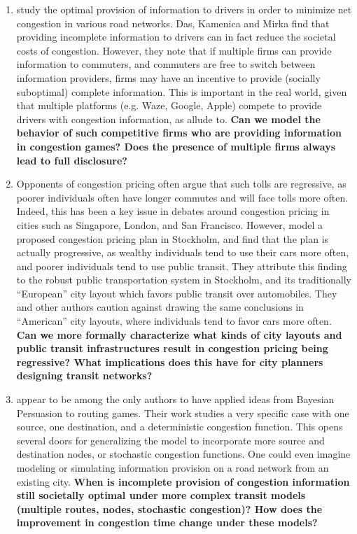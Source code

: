 \documentclass[JEL]{AEA}
\begin{document}
\begin{enumerate}
\item \cite{das-2017} study the optimal provision of information to drivers in order to minimize net congestion in various road networks. Das, Kamenica and Mirka find that providing incomplete information to drivers can in fact reduce the societal costs of congestion. However, they note that if multiple firms can provide information to commuters, and commuters are free to switch between information providers, firms may have an incentive to provide (socially suboptimal) complete information. This is important in the real world, given that multiple platforms (e.g. Waze, Google, Apple) compete to provide drivers with congestion information, as \cite{ostrovsky-2018} allude to. \textbf{Can we model the behavior of such competitive firms who are providing information in congestion games? Does the presence of multiple firms always lead to full disclosure?}

\item Opponents of congestion pricing often argue that such tolls are regressive, as poorer individuals often have longer commutes and will face tolls more often. Indeed, this has been a key issue in debates around congestion pricing in cities such as Singapore, London, and San Francisco. However, \cite{eliasson-2006} model a proposed congestion pricing plan in Stockholm, and find that the plan is actually progressive, as wealthy individuals tend to use their cars more often, and poorer individuals tend to use public transit. They attribute this finding to the robust public transportation system in Stockholm, and its traditionally ``European” city layout which favors public transit over automobiles. They and other authors caution against drawing the same conclusions in ``American” city layouts, where individuals tend to favor cars more often. \textbf{Can we more formally characterize what kinds of city layouts and public transit infrastructures result in congestion pricing being regressive? What implications does this have for city planners designing transit networks?}

\item \cite{das-2017} appear to be among the only authors to have applied ideas from Bayesian Persuasion to routing games. Their work studies a very specific case with one source, one destination, and a deterministic congestion function. This opens several doors for generalizing the model to incorporate more source and destination nodes, or stochastic congestion functions. One could even imagine modeling or simulating information provision on a road network from an existing city. \textbf{When is incomplete provision of congestion information still societally optimal under more complex transit models (multiple routes, nodes, stochastic congestion)? How does the improvement in congestion time change under these models?}


\end{enumerate}
\end{document}
